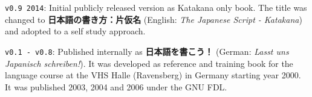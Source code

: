 \texttt{v0.9 2014}: Initial publicly released version as Katakana only book.
The title was changed to \textbf{日本語の書き方：片仮名} (English: \textit{The
Japanese Script - Katakana}) and adopted to a self study approach.

\texttt{v0.1 - v0.8}: Published internally as \textbf{日本語を書こう！}
(German: \textit{Lasst uns Japanisch schreiben!}). It was developed as
reference and training book for the language course at the VHS Halle
(Ravensberg) in Germany starting year 2000. It was published 2003, 2004 and
2006 under the GNU FDL.



